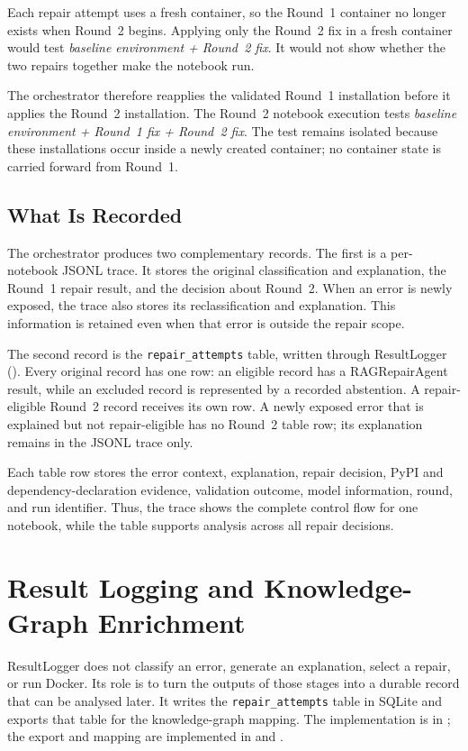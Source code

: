 Each repair attempt uses a fresh container, so the Round~1 container no longer
exists when Round~2 begins. Applying only the Round~2 fix in a fresh container
would test \emph{baseline environment + Round~2 fix}. It would not show whether
the two repairs together make the notebook run.

The orchestrator therefore reapplies the validated Round~1 installation before
it applies the Round~2 installation. The Round~2 notebook execution tests
\emph{baseline environment + Round~1 fix + Round~2 fix}. The test remains
isolated because these installations occur inside a newly created container;
no container state is carried forward from Round~1.

\subsection{What Is Recorded}
\label{sec:m-orchestrator-record}

The orchestrator produces two complementary records. The first is a per-notebook
JSONL trace. It stores the original classification and explanation, the Round~1
repair result, and the decision about Round~2. When an error is newly exposed,
the trace also stores its reclassification and explanation. This information is
retained even when that error is outside the repair scope.

The second record is the \texttt{repair\_attempts} table, written through
ResultLogger (). Every original record has one row:
an eligible record has a RAGRepairAgent result, while an excluded record is
represented by a recorded abstention. A repair-eligible Round~2 record receives
its own row. A newly exposed error that is explained but not repair-eligible has
no Round~2 table row; its explanation remains in the JSONL trace only.

Each table row stores the error context, explanation, repair decision, PyPI and
dependency-declaration evidence, validation outcome, model information, round,
and run identifier. Thus, the trace shows the complete control flow for one
notebook, while the table supports analysis across all repair decisions.

\section{Result Logging and Knowledge-Graph Enrichment}
\label{sec:m-resultlogger}

ResultLogger does not classify an error, generate an explanation, select a
repair, or run Docker. Its role is to turn the outputs of those stages into a
durable record that can be analysed later. It writes the
\texttt{repair\_attempts} table in SQLite and exports that table for the
knowledge-graph mapping. The implementation is in
; the export and mapping are implemented in
 and
.

